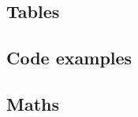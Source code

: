 \documentclass[a4paper, 12pt]{article}
\begin{document}

\subsection{Tables}




\subsection{Code examples}





\subsection{Maths}







\newpage


\end{document}
